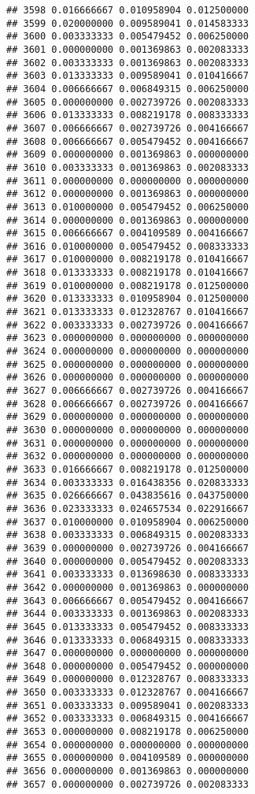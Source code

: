 \documentclass[
]{article}
\begin{document}
\begin{verbatim}
## 3598 0.016666667 0.010958904 0.012500000
## 3599 0.020000000 0.009589041 0.014583333
## 3600 0.003333333 0.005479452 0.006250000
## 3601 0.000000000 0.001369863 0.002083333
## 3602 0.003333333 0.001369863 0.002083333
## 3603 0.013333333 0.009589041 0.010416667
## 3604 0.006666667 0.006849315 0.006250000
## 3605 0.000000000 0.002739726 0.002083333
## 3606 0.013333333 0.008219178 0.008333333
## 3607 0.006666667 0.002739726 0.004166667
## 3608 0.006666667 0.005479452 0.004166667
## 3609 0.000000000 0.001369863 0.000000000
## 3610 0.003333333 0.001369863 0.002083333
## 3611 0.000000000 0.000000000 0.000000000
## 3612 0.000000000 0.001369863 0.000000000
## 3613 0.010000000 0.005479452 0.006250000
## 3614 0.000000000 0.001369863 0.000000000
## 3615 0.006666667 0.004109589 0.004166667
## 3616 0.010000000 0.005479452 0.008333333
## 3617 0.010000000 0.008219178 0.010416667
## 3618 0.013333333 0.008219178 0.010416667
## 3619 0.010000000 0.008219178 0.012500000
## 3620 0.013333333 0.010958904 0.012500000
## 3621 0.013333333 0.012328767 0.010416667
## 3622 0.003333333 0.002739726 0.004166667
## 3623 0.000000000 0.000000000 0.000000000
## 3624 0.000000000 0.000000000 0.000000000
## 3625 0.000000000 0.000000000 0.000000000
## 3626 0.000000000 0.000000000 0.000000000
## 3627 0.006666667 0.002739726 0.004166667
## 3628 0.006666667 0.002739726 0.004166667
## 3629 0.000000000 0.000000000 0.000000000
## 3630 0.000000000 0.000000000 0.000000000
## 3631 0.000000000 0.000000000 0.000000000
## 3632 0.000000000 0.000000000 0.000000000
## 3633 0.016666667 0.008219178 0.012500000
## 3634 0.003333333 0.016438356 0.020833333
## 3635 0.026666667 0.043835616 0.043750000
## 3636 0.023333333 0.024657534 0.022916667
## 3637 0.010000000 0.010958904 0.006250000
## 3638 0.003333333 0.006849315 0.002083333
## 3639 0.000000000 0.002739726 0.004166667
## 3640 0.000000000 0.005479452 0.002083333
## 3641 0.003333333 0.013698630 0.008333333
## 3642 0.000000000 0.001369863 0.000000000
## 3643 0.006666667 0.005479452 0.004166667
## 3644 0.003333333 0.001369863 0.002083333
## 3645 0.013333333 0.005479452 0.008333333
## 3646 0.013333333 0.006849315 0.008333333
## 3647 0.000000000 0.000000000 0.000000000
## 3648 0.000000000 0.005479452 0.000000000
## 3649 0.000000000 0.012328767 0.008333333
## 3650 0.003333333 0.012328767 0.004166667
## 3651 0.003333333 0.009589041 0.002083333
## 3652 0.003333333 0.006849315 0.004166667
## 3653 0.000000000 0.008219178 0.006250000
## 3654 0.000000000 0.000000000 0.000000000
## 3655 0.000000000 0.004109589 0.000000000
## 3656 0.000000000 0.001369863 0.000000000
## 3657 0.000000000 0.002739726 0.002083333

\end{verbatim}
\end{document}
